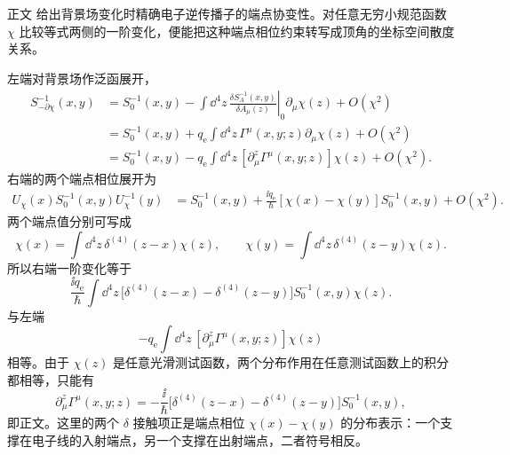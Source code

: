 \begin{derivation}

正文 给出背景场变化时精确电子逆传播子的端点协变性。对任意无穷小规范函数 $\chi$ 比较等式两侧的一阶变化，便能把这种端点相位约束转写成顶角的坐标空间散度关系。

左端对背景场作泛函展开，
\begin{align*}
 S_{-\partial\chi}^{-1}(x,y)
 &=S_0^{-1}(x,y)
 -\int\dd^4 z\,
 \left.\frac{\delta S_A^{-1}(x,y)}{\delta A_\mu(z)}\right|_0
 \partial_\mu\chi(z)+O(\chi^2)\\
 &=S_0^{-1}(x,y)
 +q_{\mathrm e}\int\dd^4 z\,\Gamma^\mu(x,y;z)\partial_\mu\chi(z)+O(\chi^2)\\
 &=S_0^{-1}(x,y)
 -q_{\mathrm e}\int\dd^4 z\,[\partial_\mu^z\Gamma^\mu(x,y;z)]\chi(z)+O(\chi^2).
\end{align*}
右端的两个端点相位展开为
\begin{align*}
 U_\chi(x)S_0^{-1}(x,y)U_\chi^{-1}(y)
 &=S_0^{-1}(x,y)
 +\frac{\ii q_{\mathrm e}}{\hbar}[\chi(x)-\chi(y)]S_0^{-1}(x,y)+O(\chi^2).
\end{align*}
两个端点值分别可写成
\begin{equation*}
 \chi(x)=\int\dd^4z\,\delta^{(4)}(z-x)\chi(z),
 \qquad
 \chi(y)=\int\dd^4z\,\delta^{(4)}(z-y)\chi(z).
\end{equation*}
所以右端一阶变化等于
\begin{equation*}
 \frac{\ii q_{\mathrm e}}{\hbar}\int\dd^4z\,
 \bigl[\delta^{(4)}(z-x)-\delta^{(4)}(z-y)\bigr]
 S_0^{-1}(x,y)\chi(z).
\end{equation*}
与左端
\begin{equation*}
 -q_{\mathrm e}\int\dd^4z\,
 [\partial_\mu^z\Gamma^\mu(x,y;z)]\chi(z)
\end{equation*}
相等。由于 $\chi(z)$ 是任意光滑测试函数，两个分布作用在任意测试函数上的积分都相等，只能有
\begin{equation*}
 \partial_\mu^z\Gamma^\mu(x,y;z)
 =-\frac{\ii}{\hbar}
 \bigl[\delta^{(4)}(z-x)-\delta^{(4)}(z-y)\bigr]
 S_0^{-1}(x,y),
\end{equation*}
即正文。这里的两个 $\delta$ 接触项正是端点相位 $\chi(x)-\chi(y)$ 的分布表示：一个支撑在电子线的入射端点，另一个支撑在出射端点，二者符号相反。
\end{derivation}

